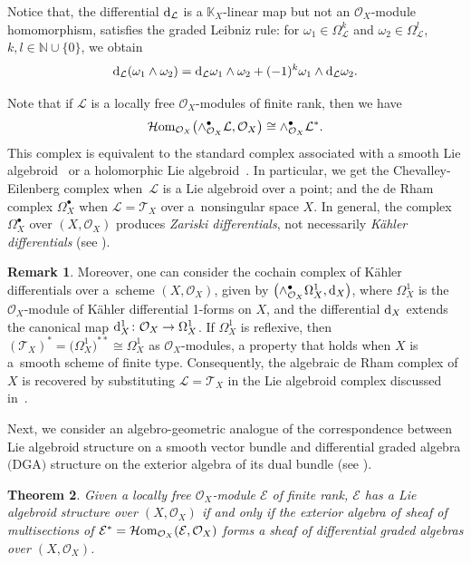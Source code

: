 \documentclass[pdftex]{sigma}
\numberwithin{equation}{section}
\newtheorem{Thm}{Theorem}[section]
\theoremstyle{definition}
\newtheorem{Rem}[Thm]{Remark}
\begin{document}
Notice that, the differential ${\rm d}_{\mathcal{L}}$ is a $\mathbb{K}_X$-linear map but not an $\mathcal{O}_X$-module homomorphism, satisfies the graded Leibniz rule: for $\omega_1 \in \Omega^k_{\mathcal{L}}$ and $\omega_2 \in \Omega^l_{\mathcal{L}}$, $k, l \in \mathbb{N} \cup \{0\}$, we obtain
\[
{\rm d}_\mathcal{L}(\omega_1 \wedge \omega_2)= {\rm d}_\mathcal{L} \omega_1 \wedge \omega_2 + (-1)^k \omega_1 \wedge {\rm d}_\mathcal{L}\omega_2.
\]

Note that if $\mathcal{L}$ is a locally free $\mathcal{O}_X$-modules of finite rank, then we have
\[
\mathcal{H}{\rm om}_{\mathcal{O}_X}\bigl(\wedge^{\bullet}_{\mathcal{O}_X}\mathcal{L}, \mathcal{O}_X\bigr) \cong \wedge^{\bullet}_{\mathcal{O}_X}\mathcal{L}^*.
\]
This complex is equivalent to the standard complex associated with a smooth Lie algebroid~\cite{KM} or a holomorphic Lie algebroid~\cite{BP}. In particular, we get the Chevalley-Eilenberg complex when~$\mathcal{L}$ is a Lie algebroid over a point; and the de Rham complex $\Omega^\bullet_X$ when $\mathcal{L}=\mathcal{T}_X$ over a~nonsingular space $X$. In general, the complex $\Omega^\bullet_X$ over $(X, \mathcal{O}_X)$ produces \emph{Zariski differentials}, not necessarily \emph{K\"ahler differentials} (see \cite{JH, CK}).

\begin{Rem}
Moreover, one can consider the cochain complex of K\"ahler differentials over a~scheme $(X, \mathcal{O}_X)$, given by
$\bigl(\wedge^{\bullet}_{\mathcal{O}_X} \Omega^1_X, {\rm d}_X\bigr)$,
	where $\Omega^1_X$ is the $\mathcal{O}_X$-module of K\"ahler differential 1\nobreakdash-forms on $X$, and the differential ${\rm d}_X$ extends the canonical map ${\rm d}^1_X\colon \mathcal{O}_X \to \Omega^1_X$.
	If $\Omega^1_X$ is reflexive, then $(\mathcal{T}_X)^* = \bigl(\Omega^1_X\bigr)^{**} \cong \Omega^1_X$ as $\mathcal{O}_X$-modules, a property that holds when $X$ is a~smooth scheme of finite type. Consequently, the algebraic de Rham complex of $X$ is recovered by substituting $\mathcal{L} = \mathcal{T}_X$ in the Lie algebroid complex discussed in~\cite{UB}.
\end{Rem}
Next, we consider an algebro-geometric analogue of the correspondence between Lie algebroid structure on a smooth vector bundle and differential graded algebra $($DGA$)$ structure on the exterior algebra of its dual bundle (see \cite{KS-M, PX}).
\begin{Thm} \label{Lie alg & dga} Given a locally free $\mathcal{O}_X$-module $\mathcal{E}$ of finite rank, $\mathcal{E}$ has a Lie algebroid structure over $(X, \mathcal{O}_X)$ if and only if the exterior algebra of sheaf of multisections  of $\mathcal{E}^*=\mathcal{H}{\rm om}_{\mathcal{O}_X}(\mathcal{E}, \mathcal{O}_X)$ forms a sheaf of differential graded algebras over $(X, \mathcal{O}_X)$.
\end{Thm}
\end{document}
